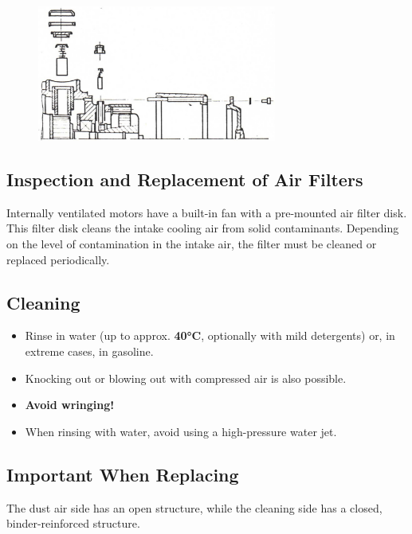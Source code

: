 \begin{figure}[H]
    \centering
    \includegraphics[width=0.7\textwidth]{images/chapter7/air_filter_assembly.jpg}
    \label{fig:air_filter_assembly}
\end{figure}

\subsection*{Inspection and Replacement of Air Filters}

Internally ventilated motors have a built-in fan with a pre-mounted air filter disk.  
This filter disk cleans the intake cooling air from solid contaminants.  
Depending on the level of contamination in the intake air, the filter must be cleaned or replaced periodically.

\newpage

\subsection*{Cleaning}

\begin{itemize}
    \setlength{\itemsep}{0pt} \setlength{\parskip}{0pt}
    \item Rinse in water (up to approx. \textbf{40°C}, optionally with mild detergents)  
          or, in extreme cases, in gasoline.
    \item Knocking out or blowing out with compressed air is also possible.
    \item \textbf{Avoid wringing!}
    \item When rinsing with water, avoid using a high-pressure water jet.
\end{itemize}

\subsection*{Important When Replacing}

The dust air side has an open structure, while the cleaning side has a closed,  
\\binder-reinforced structure.

